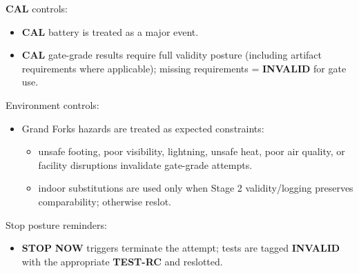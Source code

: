 \documentclass[10pt]{article}
\begin{document}
\textbf{CAL} controls:

\begin{itemize}
\item \textbf{CAL} battery is treated as a major event.
\item \textbf{CAL} gate-grade results require full validity posture (including artifact requirements where applicable); missing requirements = \textbf{INVALID} for gate use.
\end{itemize}

Environment controls:

\begin{itemize}
\item Grand Forks hazards are treated as expected constraints:
  \begin{itemize}
  \item unsafe footing, poor visibility, lightning, unsafe heat, poor air quality, or facility disruptions invalidate gate-grade attempts.
  \item indoor substitutions are used only when Stage 2 validity/logging preserves comparability; otherwise reslot.
  \end{itemize}
\end{itemize}

Stop posture reminders:

\begin{itemize}
\item \textbf{STOP} \textbf{NOW} triggers terminate the attempt; tests are tagged \textbf{INVALID} with the appropriate \textbf{TEST-RC} and reslotted.
\end{itemize}
\end{document}
